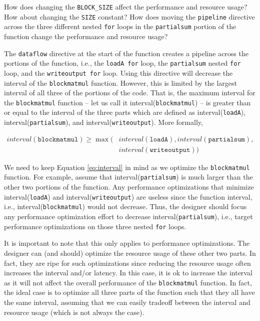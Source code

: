 \begin{exercise}
How does changing the \lstinline{BLOCK_SIZE} affect the performance and resource usage? How about changing the \lstinline{SIZE} constant? How does moving the \lstinline{pipeline} directive across the three different nested \lstinline{for} loops in the \lstinline{partialsum} portion of the function change the performance and resource usage?
\end{exercise}

The \lstinline{dataflow} directive at the start of the function creates a pipeline across the portions of the function, i.e., the \lstinline{loadA for} loop, the \lstinline{partialsum} nested \lstinline{for} loop, and the \lstinline{writeoutput for} loop. Using this directive will decrease the interval of the \lstinline{blockmatmul} function. However, this is limited by the largest interval of all three of the portions of the code. That is, the maximum interval for the \lstinline{blockmatmul} function -- let us call it interval(\lstinline{blockmatmul}) -- is greater than or equal to the interval of the three parts which are defined as interval(\lstinline{loadA}), interval(\lstinline{partialsum}), and interval(\lstinline{writeoutput}). More formally, 

\begin{align}
\label{eq:interval}
interval(\texttt{blockmatmul}) \ge \max(&interval(\texttt{loadA}), interval(\texttt{partialsum}), \nonumber \\
 & interval(\texttt{writeoutput}))
 \end{align}

We need to keep Equation \ref{eq:interval} in mind as we optimize the \lstinline{blockmatmul} function. For example, assume that interval(\lstinline{partialsum}) is much larger than the other two portions of the function. Any performance optimizations that minimize interval(\lstinline{loadA}) and interval(\lstinline{writeoutput}) are useless since the function interval, i.e., interval(\lstinline{blockmatmul}) would not decrease. Thus, the designer should focus any performance optimization effort to decrease interval(\lstinline{partialsum}), i.e., target performance optimizations on those three nested \lstinline{for} loops. 

It is important to note that this only applies to performance optimizations. The designer can (and should) optimize the resource usage of these other two parts. In fact, they are ripe for such optimizations since reducing the resource usage often increases the interval and/or latency. In this case, it is ok to increase the interval as it will not affect the overall performance of the \lstinline{blockmatmul} function. In fact, the ideal case is to optimize all three parts of the function such that they all have the same interval, assuming that we can easily tradeoff between the interval and resource usage (which is not always the case). 

